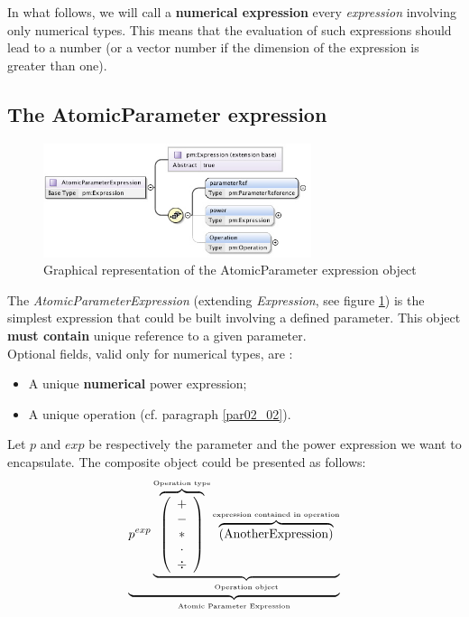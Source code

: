 \documentclass[a4paper,11pt] {article}
\begin{document}
 In what follows, we will call a {\bf numerical expression} every {\it
expression} involving only numerical types. This means that the evaluation of such expressions
should lead to a number (or a vector number if the dimension of the expression is greater than
one).\\


\subsection{The AtomicParameter expression}\label{par02_01}
\begin{figure}[htbp]
\begin{center}
\includegraphics[width=0.7\textwidth]{pictures/AtomicParameter.jpg} 
\caption{Graphical representation of the AtomicParameter expression object}
\label{Pic-AtomicParameter}
\end{center}
\end{figure}
The {\it AtomicParameterExpression} (extending {\it Expression}, see figure
\ref{Pic-AtomicParameter}) is the simplest expression that could be built involving a defined
parameter. This object {\bf must contain} unique reference to a given parameter.\\

Optional fields, valid only for numerical types, are :
\begin{itemize}
\item A unique {\bf numerical} power expression;
\item A unique operation (cf. paragraph \ref{par02_02}).\\
\end{itemize}
Let $p$ and $exp$ be respectively the parameter and the power expression we want to encapsulate. The
composite object could be presented as follows:
\begin{equation}\label{eq01}
 \underbrace{  p^{exp} \underbrace{  \overbrace{\left( \begin{array}{c} + \\ - \\ \ast  \\ \cdot \\ \div   \end{array} \right) }^{\mbox{\tiny Operation type}}
 \overbrace{    \left( \mbox{AnotherExpression}\right) }^{\mbox{\tiny expression contained in operation}}   }_{\mbox{\tiny Operation object}}}_{\mbox{\tiny Atomic Parameter Expression}}
\end{equation}
\end{document}
